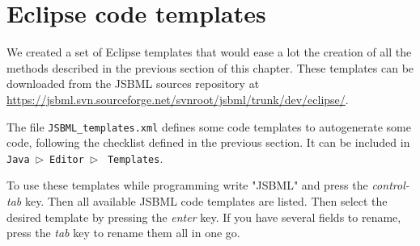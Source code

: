 
\section{Eclipse code templates}

We created a set of Eclipse templates that would ease a lot the creation of all 
the methods described in the previous section of this chapter. These templates
can be downloaded from the JSBML sources repository at 
\url{https://jsbml.svn.sourceforge.net/svnroot/jsbml/trunk/dev/eclipse/}.

The file \texttt{JSBML\_templates.xml} defines some code templates to autogenerate some code, following the
checklist defined in the previous section.
It can be included in \texttt{Java}~$\rhd$~\texttt{Editor}~$\rhd$ ~\texttt{Templates}.

To use these templates while programming write "JSBML" and press the \emph{control-tab} key. Then all 
available JSBML code templates are listed. Then select the desired template by pressing 
the \emph{enter} key. If you have several fields to rename, press the \emph{tab} key to rename them all in one go.
